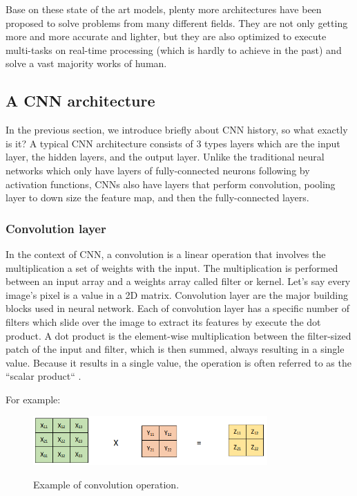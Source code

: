 	Base on these state of the art models, plenty more architectures have been proposed to solve problems from many different fields. They are not only getting more and more accurate and lighter, but they are also optimized to execute multi-tasks on real-time processing (which is hardly to achieve in the past) and solve a vast majority works of human.

\subsection{A CNN architecture}
\label{subsection:CNNarchi}
\noindent

	In the previous section, we introduce briefly about CNN history, so what exactly is it? A typical CNN architecture consists of 3 types layers which are the input layer, the hidden layers, and the output layer. Unlike the traditional neural networks which only have layers of fully-connected neurons following by activation functions, CNNs also have layers that perform convolution, pooling layer to down size the feature map, and then the fully-connected layers.
	
\subsubsection{Convolution layer}
\label{subsubsection:convlayer}
\noindent

	In the context of CNN, a convolution is a linear operation that involves the multiplication a set of weights with the input. The multiplication is performed between an input array and a weights array called filter or kernel. Let’s say every image’s pixel is a value in a 2D matrix. Convolution layer are the major building blocks used in neural network. Each of convolution layer has a specific number of filters which slide over the image to extract its features by execute the dot product. A dot product is the element-wise multiplication between the filter-sized patch of the input and filter, which is then summed, always resulting in a single value. Because it results in a single value, the operation is often referred to as the “scalar product“ \cite{dive2dl}.
	
	For example:

	\begin{figure}[H]
		\centering
		{\includegraphics[width=0.8\textwidth]{./hinhanh/chap3/conv_operation.png}}
		\caption{Example of convolution operation.}
		\label{fig:conv_operation}
	\end{figure}
	
